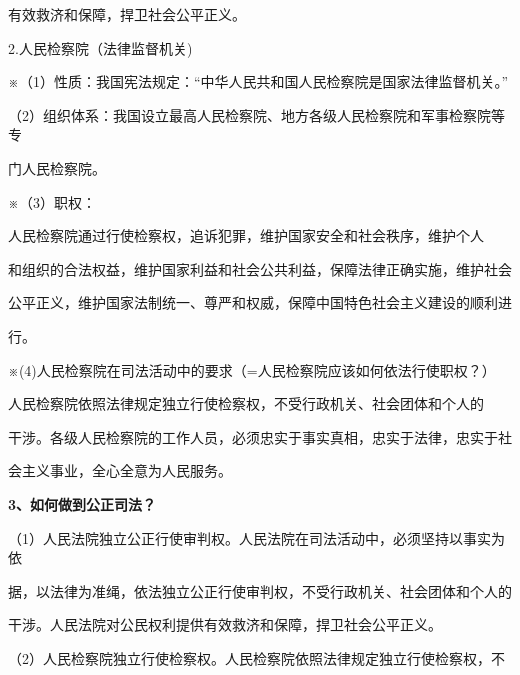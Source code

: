\documentclass[lang=cn,11pt]{elegantbook}
\begin{document}
有效救济和保障，捍卫社会公平正义。\par

2.人民检察院（法律监督机关)\par

※（1）性质：我国宪法规定：“中华人民共和国人民检察院是国家法律监督机关。”\par

（2）组织体系：我国设立最高人民检察院、地方各级人民检察院和军事检察院等专\par

门人民检察院。\par

※（3）职权：\par

人民检察院通过行使检察权，追诉犯罪，维护国家安全和社会秩序，维护个人\par

和组织的合法权益，维护国家利益和社会公共利益，保障法律正确实施，维护社会\par

公平正义，维护国家法制统一、尊严和权威，保障中国特色社会主义建设的顺利进\par

行。\par

※(4)人民检察院在司法活动中的要求（=人民检察院应该如何依法行使职权？）\par

人民检察院依照法律规定独立行使检察权，不受行政机关、社会团体和个人的\par

干涉。各级人民检察院的工作人员，必须忠实于事实真相，忠实于法律，忠实于社\par

会主义事业，全心全意为人民服务。\par

\textbf{3、如何做到公正司法？}\par

（1）人民法院独立公正行使审判权。人民法院在司法活动中，必须坚持以事实为依\par

据，以法律为准绳，依法独立公正行使审判权，不受行政机关、社会团体和个人的\par

干涉。人民法院对公民权利提供有效救济和保障，捍卫社会公平正义。\par

（2）人民检察院独立行使检察权。人民检察院依照法律规定独立行使检察权，不\par
\end{document}
